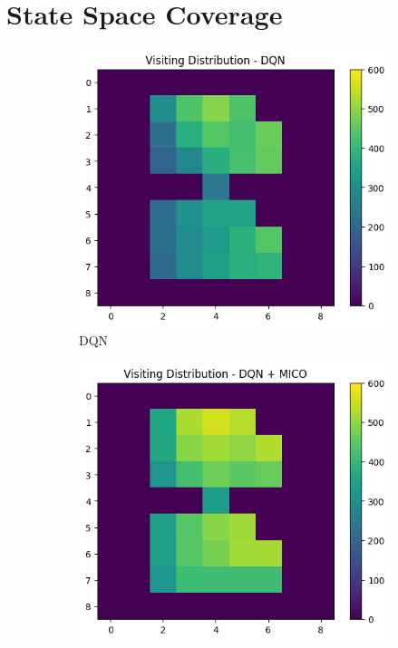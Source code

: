 \section{State Space Coverage}

\begin{figure}[h]
    \centering
    \hspace*{\fill}
    \begin{subfigure}{0.45\textwidth}
        \centering %
        \includegraphics[width=0.70\linewidth]{Results/grid_world/visitation_distribution_dqn.png}
        \caption{DQN}
        \label{fig:on_policy_weighting}
    \end{subfigure}
    \hspace*{\fill} %
    \begin{subfigure}{0.45\textwidth}
        \centering %
        \includegraphics[width=0.70\linewidth]{Results/grid_world/visitation_distribution_dqn_mico.png}

\end{subfigure}
\end{figure}

